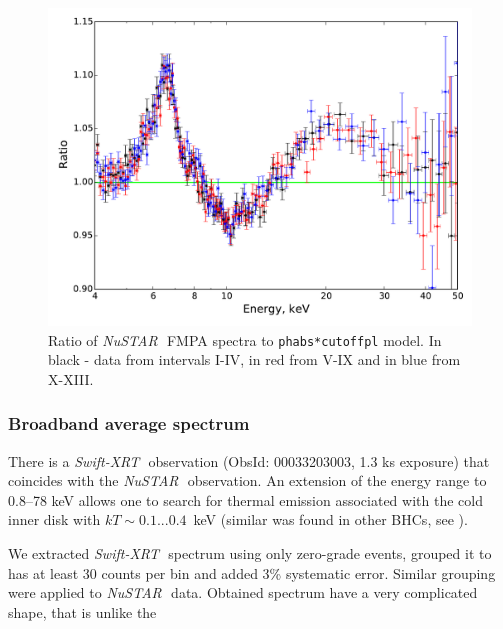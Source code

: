 \documentclass[a4paper,fleqn,usenatbib]{mnras}
\def\swiftx{{\em Swift-XRT\,}}
\def\nustar{{\em NuSTAR\,}}
\begin{document}
\begin{figure}
\centerline{\includegraphics[width=\linewidth]{ratios_v01.pdf}}
\caption{Ratio of \nustar\, FMPA spectra to \texttt{phabs*cutoffpl} model. In black - data from intervals I-IV, in red from V-IX and in blue from X-XIII.} 
\label{fig:ratios}
\end{figure}  

            
\subsubsection{Broadband average spectrum}
\label{sec:spec}            
There is a \swiftx\, observation (ObsId: 00033203003, 1.3 ks exposure) that coincides with the \nustar\, observation. 
An extension of the energy range to 0.8--78 keV allows one to search for thermal emission associated with the cold inner disk with $kT \sim 0.1...0.4$~keV (similar was found in other BHCs, see \cite[][ etc]{miller06b,miller06a,parker15}).

We extracted \swiftx\, spectrum using only zero-grade events, grouped it to has at least 30 counts per bin and added 3\% systematic error. 
Similar grouping were applied to \nustar\, data. Obtained spectrum have a very complicated shape, that is unlike the  \citep{zdziarski04}
\end{document}

